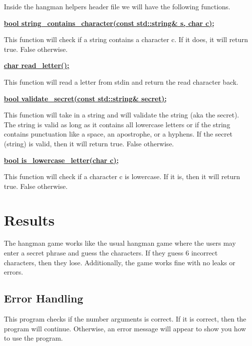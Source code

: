 \documentclass{article}
\begin{document}
Inside the hangman helpers header file we will have the following functions.\vspace{6mm}

\noindent \textbf{\underline{bool string_contains_character(const std::string\& s, char c);}}\vspace{3mm}

\noindent This function will check if a string contains a character c. If it does, it will return true. False otherwise. \vspace{3mm}

\noindent \textbf{\underline{char read_letter();}}\vspace{3mm}

\noindent This function will read a letter from stdin and return the read character back. \vspace{3mm}

\noindent \textbf{\underline{bool validate_secret(const std::string\& secret);
}}\vspace{3mm}

\noindent This function will take in a string and will validate the string (aka the secret). The string is valid as long as it contains all lowercase letters or if the string contains punctuation like a space, an apostrophe, or a hyphens. If the secret (string) is valid, then it will return true. False otherwise. \vspace{3mm}

\noindent \textbf{\underline{bool is_lowercase_letter(char c);}}\vspace{3mm}

\noindent This function will check if a character c is lowercase. If it is, then it will return true. False otherwise. \vspace{3mm}

\section{Results}

The hangman game works like the usual hangman game where the users may enter a secret phrase and guess the characters. If they guess 6 incorrect characters, then they lose. Additionally, the game works fine with no leaks or errors. 

\subsection{Error Handling}

This program checks if the number arguments is correct. If it is correct, then the program will continue. Otherwise, an error message will appear to show you how to use the program.





\end{document}
